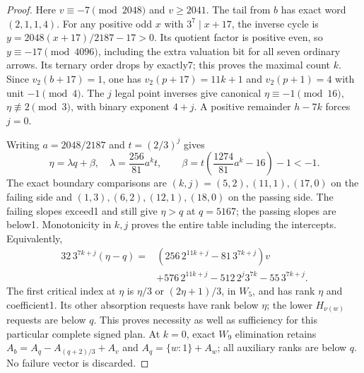 \documentclass[11pt]{article}
\begin{document}
\begin{proof}
Here $v\equiv-7\pmod{2048}$ and $v\ge2041$. The tail from $b$
has exact word $(2,1,1,4)$. For any positive odd $x$ with
$3^7\mid x+17$, the inverse cycle is
$y=2048(x+17)/2187-17>0$. Its quotient factor is positive even,
so $y\equiv-17\pmod{4096}$, including the extra valuation bit
for all seven ordinary arrows. Its ternary order drops by exactly7;
this proves the maximal count $k$. Since $v_2(b+17)=1$, one has
$v_2(p+17)=11k+1$ and $v_2(p+1)=4$ with unit $-1\pmod4$.
The $j$ legal point inverses give canonical
$\eta\equiv-1\pmod{16}$, $\eta\not\equiv2\pmod3$, with
binary exponent $4+j$. A positive remainder $h-7k$ forces $j=0$.

Writing $a=2048/2187$ and $t=(2/3)^j$ gives
\[
 \eta=\lambda q+\beta,\quad
 \lambda=\frac{256}{81}a^kt,\qquad
 \beta=t\left(\frac{1274}{81}a^k-16\right)-1<-1.
\]
The exact boundary comparisons are $(k,j)=(5,2),(11,1),(17,0)$
on the failing side and $(1,3),(6,2),(12,1),(18,0)$ on the passing
side. The failing slopes exceed1 and still give $\eta>q$ at
$q=5167$; the passing slopes are below1. Monotonicity in $k,j$
proves the entire table including the intercepts. Equivalently,
\[
\begin{split}
32\,3^{7k+j}(\eta-q)
={}&(256\,2^{11k+j}-81\,3^{7k+j})v\\
 &+576\,2^{11k+j}-512\,2^j3^{7k}-55\,3^{7k+j}.
\end{split}
\]
The first critical index at $\eta$ is $\eta/3$ or $(2\eta+1)/3$,
in $W_5$, and has rank $\eta$ and coefficient1. Its other absorption
requests have rank below $\eta$; the lower $H_{\nu(w)}$ requests
are below $q$. This proves necessity as well as sufficiency for this
particular complete signed plan. At $k=0$, exact $W_9$ elimination
retains
$A_b=A_q-A_{(q+2)/3}+A_v$ and $A_q=\{w:1\}+A_w$;
all auxiliary ranks are below $q$. No failure vector is discarded.
\end{proof}
\end{document}
